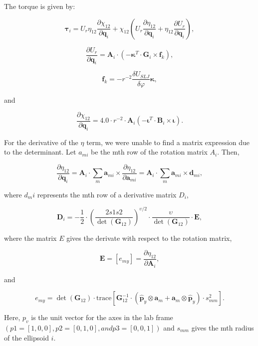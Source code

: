 The torque is given by:

$$ \mathbf{\tau}_i = U_r \eta_{12} \frac{ \partial \chi_{12} }{
\partial \mathbf{q}_i } + \chi_{12} ( U_r \frac{ \partial \eta_{12} }{
\partial \mathbf{q}_i } + \eta_{12} \frac{ \partial U_r }{ \partial
\mathbf{q}_i } ), $$

$$ \frac{ \partial U_r }{ \partial \mathbf{q}_i } = \mathbf{A}_i \cdot
(- \mathbf{\kappa}^T \cdot \mathbf{G}_i \times \mathbf{f}_k ), $$

$$ \mathbf{f}_k = - r^{-2} \frac{ \delta U_{SLJ} }{ \delta \varphi }
\mathbf{\kappa}, $$

and

$$ \frac{ \partial \chi_{12} }{ \partial \mathbf{q}_i } = 4.0 \cdot
r^{-2} \cdot \mathbf{A}_i (- \mathbf{\iota}^T \cdot \mathbf{B}_i
\times \mathbf{\iota} ). $$

For the derivative of the $\eta$ term, we were unable to find a matrix
expression due to the determinant. Let $a_{mi}$ be the mth row of the
rotation matrix $A_i$. Then,

$$ \frac{ \partial \eta_{12} }{ \partial \mathbf{q}_i } = \mathbf{A}_i
\cdot \sum_m \mathbf{a}_{mi} \times \frac{ \partial \eta_{12} }{
\partial \mathbf{a}_{mi} } = \mathbf{A}_i \cdot \sum_m \mathbf{a}_{mi}
\times \mathbf{d}_{mi}, $$

where $d_mi$ represents the mth row of a derivative matrix $D_i$,

$$ \mathbf{D}_i = - \frac{1}{2} \cdot ( \frac{2s1s2}{\det (
\mathbf{G}_{12} ) } )^{ \upsilon / 2 } \cdot {\frac{\upsilon}{\det (
\mathbf{G}_{12} ) }} \cdot \mathbf{E}, $$

where the matrix $E$ gives the derivate with respect to the rotation
matrix,

$$ \mathbf{E} = [ e_{my} ] = \frac{ \partial \eta_{12} }{ \partial
\mathbf{A}_i }, $$

and

$$ e_{my} = \det ( \mathbf{G}_{12} ) \cdot \mbox{trace} [
\mathbf{G}_{12}^{-1} \cdot ( \hat{\mathbf{p}}_y \otimes \mathbf{a}_m +
\mathbf{a}_m \otimes \hat{\mathbf{p}}_y ) \cdot s_{mm}^2 ]. $$

Here, $p_v$ is the unit vector for the axes in the lab frame $(p1=[1, 0,
0], p2=[0, 1, 0], and p3=[0, 0, 1])$ and $s_{mm}$ gives the mth radius of
the ellipsoid $i$.


